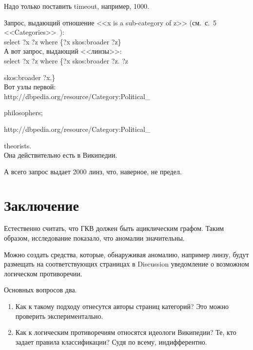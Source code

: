 \begin{multicols}{2}
   Надо только поставить timeout, например, 1000.
   
   Запрос, выдающий отношение <<{\sf x} is a sub-category of {\sf z}>> (см.\ с.~5 
<<Categories>>~\cite{5-shk}):\\[-8pt]

{\sf select ?x ?z where \{?x skos:broader ?z\}}\\[-8pt]
   
   А вот запрос, выдающий <<линзы>>:\\[-8pt]

{\sf select ?x ?z where \{?x skos:broader ?z. ?z }

{\sf skos:broader ?x.\}}\\[-8pt]
   
   Вот узлы первой:\\[-8pt] 

{\sf http://dbpedia.org/resource/Category:Political\_}

{\sf philosophers;}


   
{\sf http://dbpedia.org/resource/Category:Political\_}

{\sf theorists.}\\[-8pt]
   
   Она действительно есть в Википедии.
   
   А всего запрос выдает 2000 линз, что, наверное, не предел.
   
\section{Заключение}

   Естественно считать, что ГКВ должен быть ацик\-ли\-че\-ским графом. Таким образом, 
исследование показало, что аномалии значительны.
   
   Можно создать средства, которые, обнаруживая аномалию, например линзу, будут 
размещать на соответствующих страницах в Discussion уведомление о возможном 
логическом противоречии.
   
   Основных вопросов два.
   \begin{enumerate}[1.]
   \item Как к такому подходу отнесутся авторы страниц категорий? Это можно проверить 
экспериментально.
   \item Как к логическим противоречиям относятся идеологи Википедии? Те, кто задает 
правила классификации? Судя по всему, индифферентно.
   \end{enumerate}
   

\end{multicols}
